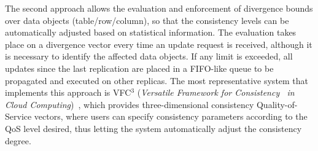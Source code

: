 The second approach allows the evaluation and enforcement of divergence bounds over data objects (table/row/column), so that the consistency levels can be automatically adjusted based on statistical information. The evaluation takes place on a divergence vector every time an update request is received, although it is necessary to identify the affected data objects. If any limit is exceeded, all updates since the last replication are placed in a FIFO-like queue to be propagated and executed on other replicas. 
The most representative system that implements 
this approach is VFC$^3$ (\textit{Versatile Framework for Consistency ~in Cloud Computing})~\cite{esteves2012quality}, which provides three-dimensional consistency Qual\-ity-of-Service vectors, where users can specify consistency parameters according to the QoS level desired, thus letting the system automatically adjust the consistency degree.

